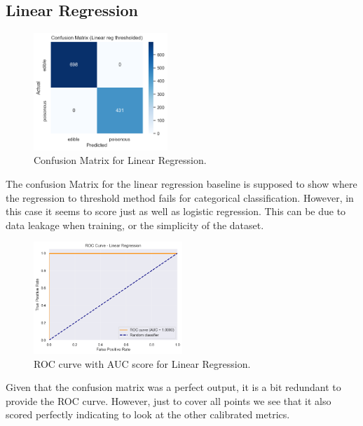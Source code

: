\documentclass[conference]{IEEEtran}
\begin{document}
\subsection{Linear Regression}
\begin{figure}[!htbp]
\centering
\includegraphics[width=0.45\textwidth]{images/linConf.png}
\caption{Confusion Matrix for Linear Regression.}
\label{fig:lin_confusion}
\end{figure}
\FloatBarrier
The confusion Matrix for the linear regression baseline is supposed to show where the regression to threshold method fails for categorical classification. However, in this case it seems to score just as well as logistic regression. This can be due to data leakage when training, or the simplicity of the dataset. 
\begin{figure}[!htbp]
\centering
\includegraphics[width=0.5\textwidth]{images/linRoc.png}
\caption{ROC curve with AUC score for Linear Regression.}
\label{fig:lin_roc}
\end{figure}
\FloatBarrier
Given that the confusion matrix was a perfect output, it is a bit redundant to provide the ROC curve. However, just to cover all points we see that it also scored perfectly indicating to look at the other calibrated metrics.
\end{document}
